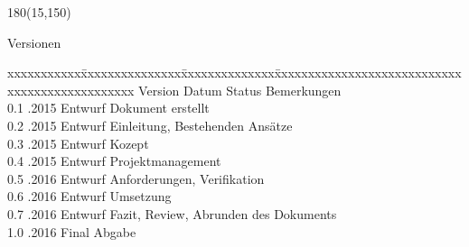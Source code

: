 
\begin{textblock}{180}(15,150)
\color{black}
\begin{huge}
Versionen
\end{huge}


\vspace{10mm}

\fontsize{10pt}{18pt}\selectfont
\begin{tabbing}
xxxxxxxxxxx\=xxxxxxxxxxxxxxx\=xxxxxxxxxxxxxx\=xxxxxxxxxxxxxxxxxxxxxxxxxxxxxxxxxxxxxxxxxxxxxxx \kill
Version	\> Datum	\> Status		\> Bemerkungen		\\
0.1	.2015	\> Entwurf		\> Dokument erstellt	\\	
0.2	.2015	\> Entwurf		\> Einleitung, Bestehenden Ansätze \\	
0.3	.2015	\> Entwurf		\> Kozept\\	
0.4	.2015	\> Entwurf		\> Projektmanagement	\\	
0.5	.2016	\> Entwurf		\> Anforderungen, Verifikation \\	
0.6	.2016	\> Entwurf		\> Umsetzung\\
0.7	.2016	\> Entwurf		\> Fazit, Review, Abrunden des Dokuments\\
1.0	.2016	\> Final		    \> Abgabe\\
\end{tabbing}

\end{textblock}


